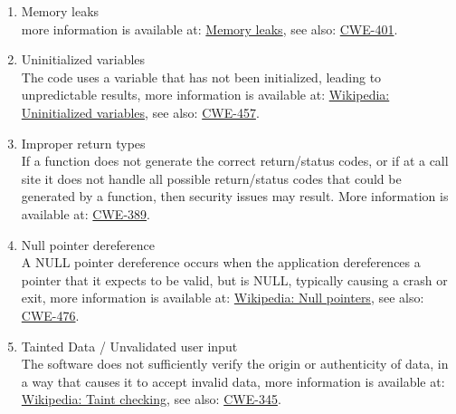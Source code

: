 \begin{enumerate}
         \item Memory leaks \\
               more information is available at:
               \href{http://en.wikipedia.org/wiki/Memory_leak}{Memory leaks}, 
               see also:
               \href{http://cwe.mitre.org/data/definitions/401.html}{CWE-401}.

         \item Uninitialized variables \\
               The code uses a variable that has not been initialized, leading to
               unpredictable results, more information is available at:
               \href{http://en.wikipedia.org/wiki/Uninitialized_variable}{Wikipedia: Uninitialized variables}, 
               see also:
               \href{http://cwe.mitre.org/data/definitions/457.html}{CWE-457}.

         \item Improper return types \\
               If a function does not generate the correct return/status
               codes, or if at a call site it does not handle all possible return/status codes that could
               be generated by a function, then security issues may result. 
               More information is available at:
               \href{http://cwe.mitre.org/data/definitions/389.html}{CWE-389}.

         \item Null pointer dereference \\
               A NULL pointer dereference occurs when the application dereferences a
               pointer that it expects to be valid, but is NULL, typically causing a crash
               or exit, more information is available at:
               \href{http://en.wikipedia.org/wiki/Pointer}{Wikipedia: Null pointers}, 
               see also:
               \href{http://cwe.mitre.org/data/definitions/476.html}{CWE-476}.

         \item Tainted Data / Unvalidated user input \\
               The software does not sufficiently verify the origin or authenticity of
               data, in a way that causes it to accept invalid data, more information is
               available at:
               \href{http://en.wikipedia.org/wiki/Taint_checking}{Wikipedia: Taint checking}, 
               see also:
               \href{http://cwe.mitre.org/data/definitions/345.html}{CWE-345}.


\end{enumerate}
